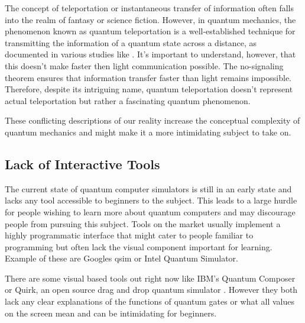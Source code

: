 The concept of teleportation or instantaneous transfer of information often falls into the realm of fantasy or science fiction. However, in quantum mechanics, the phenomenon known as quantum teleportation is a well-established technique for transmitting the information of a quantum state across a distance, as documented in various studies like \cite{quanttelep}. It's important to understand, however, that this doesn't make faster then light communication possible. The no-signaling theorem ensures that information transfer faster than light remains impossible. Therefore, despite its intriguing name, quantum teleportation doesn't represent actual teleportation but rather a fascinating quantum phenomenon.

These conflicting descriptions of our reality increase the conceptual complexity of quantum mechanics and might make it a more intimidating subject to take on.



\subsection{Lack of Interactive Tools}
The current state of quantum computer simulators is still in an early state and lacks any tool accessible to beginners to the subject. This leads to a large hurdle for people wishing to learn more about quantum computers and may discourage people from pursuing this subject. Tools on the market usually implement a highly programmatic interface that might cater to people familiar to programming but often lack the visual component important for learning. Example of these are Googles qsim\cite{googleqsim} or Intel Quantum Simulator\cite{intelqsim}.

There are some visual based tools out right now like IBM's Quantum Composer \cite{ibmqsim} or Quirk, an open source drag and drop quantum simulator \cite{openqsim}. However they both lack any clear explanations of the functions of quantum gates or what all values on the screen mean and can be intimidating for beginners.
